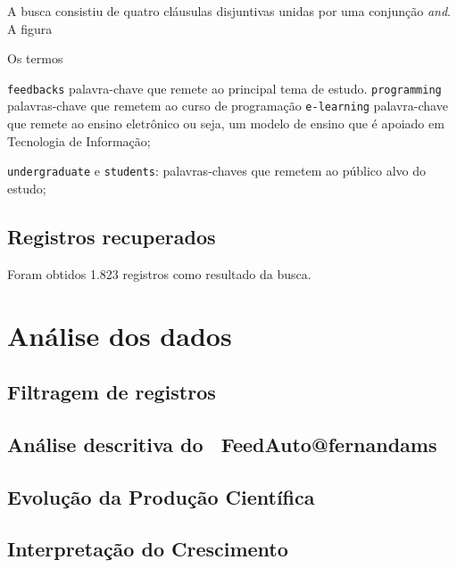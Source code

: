 A busca consistiu de quatro cláusulas disjuntivas unidas por uma conjunção \textit{and}. A figura

Os termos

 \texttt{feedbacks} palavra-chave que remete ao principal tema de estudo.
 \texttt{programming} palavras-chave que remetem ao curso de programação 
 \texttt{e-learning} palavra-chave  que remete ao ensino eletrônico ou seja, um modelo de ensino que é apoiado em Tecnologia de Informação;

\texttt{undergraduate} e \texttt{students}: palavras-chaves que remetem ao público alvo do estudo; 

\subsection{Registros recuperados}

Foram obtidos 1.823 registros como resultado da busca. 

\section{Análise dos dados}

\subsection{Filtragem de registros}

\subsection{Análise descritiva do \dataset\ FeedAuto@fernandams} 

\subsection{Evolução da Produção Científica}

\subsection{Interpretação do Crescimento}


